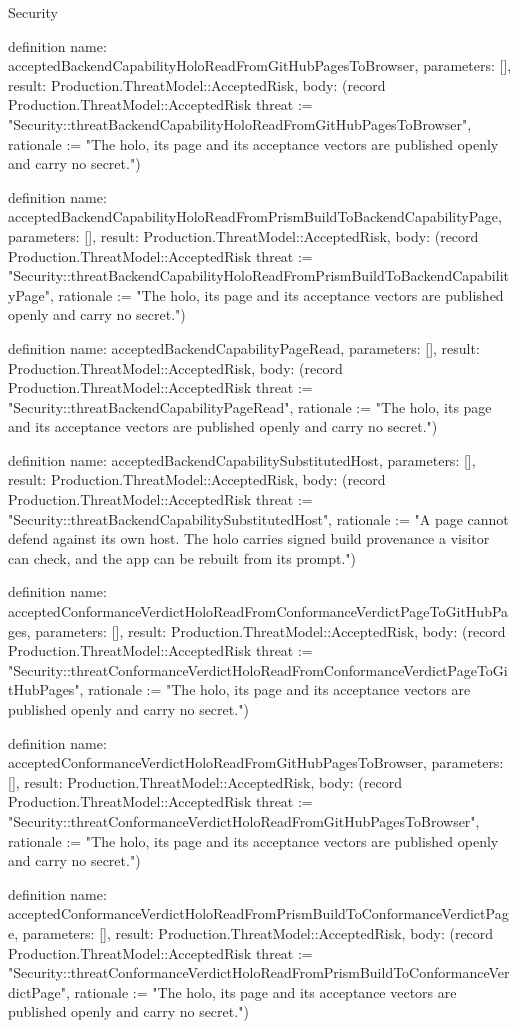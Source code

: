 \begin{lexlean}{Security}
\begin{semanticmodule}
definition{
  name: acceptedBackendCapabilityHoloReadFromGitHubPagesToBrowser,
  parameters: [],
  result: Production.ThreatModel::AcceptedRisk,
  body: (record Production.ThreatModel::AcceptedRisk {threat := "Security::threatBackendCapabilityHoloReadFromGitHubPagesToBrowser", rationale := "The holo, its page and its acceptance vectors are published openly and carry no secret."})
}

definition{
  name: acceptedBackendCapabilityHoloReadFromPrismBuildToBackendCapabilityPage,
  parameters: [],
  result: Production.ThreatModel::AcceptedRisk,
  body: (record Production.ThreatModel::AcceptedRisk {threat := "Security::threatBackendCapabilityHoloReadFromPrismBuildToBackendCapabilityPage", rationale := "The holo, its page and its acceptance vectors are published openly and carry no secret."})
}

definition{
  name: acceptedBackendCapabilityPageRead,
  parameters: [],
  result: Production.ThreatModel::AcceptedRisk,
  body: (record Production.ThreatModel::AcceptedRisk {threat := "Security::threatBackendCapabilityPageRead", rationale := "The holo, its page and its acceptance vectors are published openly and carry no secret."})
}

definition{
  name: acceptedBackendCapabilitySubstitutedHost,
  parameters: [],
  result: Production.ThreatModel::AcceptedRisk,
  body: (record Production.ThreatModel::AcceptedRisk {threat := "Security::threatBackendCapabilitySubstitutedHost", rationale := "A page cannot defend against its own host. The holo carries signed build provenance a visitor can check, and the app can be rebuilt from its prompt."})
}

definition{
  name: acceptedConformanceVerdictHoloReadFromConformanceVerdictPageToGitHubPages,
  parameters: [],
  result: Production.ThreatModel::AcceptedRisk,
  body: (record Production.ThreatModel::AcceptedRisk {threat := "Security::threatConformanceVerdictHoloReadFromConformanceVerdictPageToGitHubPages", rationale := "The holo, its page and its acceptance vectors are published openly and carry no secret."})
}

definition{
  name: acceptedConformanceVerdictHoloReadFromGitHubPagesToBrowser,
  parameters: [],
  result: Production.ThreatModel::AcceptedRisk,
  body: (record Production.ThreatModel::AcceptedRisk {threat := "Security::threatConformanceVerdictHoloReadFromGitHubPagesToBrowser", rationale := "The holo, its page and its acceptance vectors are published openly and carry no secret."})
}

definition{
  name: acceptedConformanceVerdictHoloReadFromPrismBuildToConformanceVerdictPage,
  parameters: [],
  result: Production.ThreatModel::AcceptedRisk,
  body: (record Production.ThreatModel::AcceptedRisk {threat := "Security::threatConformanceVerdictHoloReadFromPrismBuildToConformanceVerdictPage", rationale := "The holo, its page and its acceptance vectors are published openly and carry no secret."})
}


\end{semanticmodule}
\end{lexlean}
